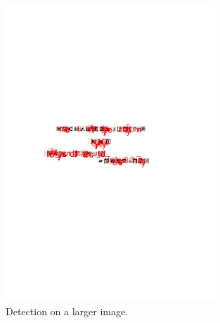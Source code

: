 \documentclass[../main.tex]{subfiles}
\begin{document}
\begin{figure}
  \hspace*{2.4cm}\includegraphics[trim={4cm, 12cm, 4cm, 10cm},width=0.7\textwidth]{figures/character_detection/detection_1.pdf}
  \caption{Detection on a larger image.}
  \label{fig:detection_large}
\end{figure}
\end{document}
